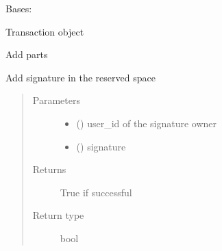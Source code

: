 \documentclass[letterpaper,10pt,english]{sphinxmanual}
\begin{document}

\begin{fulllineitems}
\label{\detokenize{bbc1.core.bbclib:bbc1.core.bbclib.BBcTransaction}}
Bases: 

Transaction object

\begin{fulllineitems}
\label{\detokenize{bbc1.core.bbclib:bbc1.core.bbclib.BBcTransaction.add}}
Add parts

\end{fulllineitems}


\begin{fulllineitems}
\label{\detokenize{bbc1.core.bbclib:bbc1.core.bbclib.BBcTransaction.add_signature}}
Add signature in the reserved space
\begin{quote}\begin{description}
\item[{Parameters}] \leavevmode\begin{itemize}
\item {} 
 () \textendash{} user\_id of the signature owner

\item {} 
 ({\hyperref[\detokenize{bbc1.core.bbclib:bbc1.core.bbclib.BBcSignature}]{}}) \textendash{} signature

\end{itemize}

\item[{Returns}] \leavevmode
True if successful

\item[{Return type}] \leavevmode
bool


\end{description}
\end{quote}
\end{fulllineitems}
\end{fulllineitems}
\end{document}
